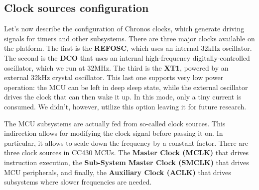 \subsection {Clock sources configuration}

Let's now describe the configuration of Chronos clocks, which generate driving signals for timers and other subsystems. There are three major clocks available on the platform. The first is the {\bf REFOSC}, which uses an internal 32kHz oscillator. The second is the {\bf DCO} that uses an internal high-frequency digitally-controlled oscillator, which we run at 32MHz. The third is the {\bf XT1}, powered by an external 32kHz crystal oscillator. This last one supports very low power operation: the MCU can be left in deep sleep state, while the external oscillator drives the clock that can then wake it up. In this mode, only a tiny current is consumed. We didn't, however, utilize this option leaving it for future research.

The MCU subsystems are actually fed from so-called clock sources. This indirection allows for modifying the clock signal before passing it on. In particular, it allows to scale down the frequency by a constant factor. There are three clock sources in CC430 MCUs. The {\bf Master Clock (MCLK)} that drives instruction execution, the {\bf Sub-System Master Clock (SMCLK)} that drives MCU peripherals, and finally, the {\bf Auxiliary Clock (ACLK)} that drives subsystems where slower frequencies are needed.


